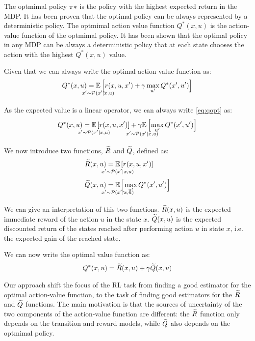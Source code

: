 \documentclass[conference]{IEEEtran}
\begin{document}
The optmimal policy $\pi*$ is the policy with the highest expected return in the MDP. It has been proven that the optimal policy can be always represented by a deterministic policy. The optmimal action velue function $Q^*(x, u)$ is the action-value function of the optmimal policy.
It has been shown that the optimal policy in any MDP can be always a deterministic policy that at each state chooses the action with the highest $Q^*(x, u)$ value.

Given that we can always write the optimal action-value function as:
\begin{align}
 Q^*(x,u)=\underset{\strut\mathclap{x'\sim \Pmodel(x'|x,u)}}{\mathbb{E}}\left[ r(x,u,x')+\gamma\max_{u'} Q^*(x',u')\right]
 \label{eq:qopt}
\end{align}

As the expected value is a linear operator, we can always write \ref{eq:qopt} as:
\begin{align}
 Q^*(x,u)=\underset{\strut\mathclap{x'\sim \Pmodel(x'|x,u)}}{\mathbb{E}}\left[ r(x,u,x')\right]+\underset{\strut\mathclap{x'\sim \Pmodel(x'|x,u)}}{\gamma\mathbb{E}}\left[ \max_{u'} Q^*(x',u')\right]
 \label{eq:qdec}
\end{align}

We now introduce two functions, $\widetilde{R}$ and $\widetilde{Q}$, defined as:
\begin{align}
 \Rtilde(x,u)&=\underset{\strut\mathclap{x'\sim \Pmodel(x'|x,u)}}{\mathbb{E}}\left[ r(x,u,x')\right] \nonumber\ \\
 \Qtilde(x,u)&=\underset{\strut\mathclap{x'\sim \Pmodel(x'|x,u)}}{\mathbb{E}}\left[\max_{u'} Q^*(x',u')\right]
 \label{eq:rqtilde}
\end{align}

We can give an interpretation of this two functions. $\widetilde{R}(x,u)$ is the expected immediate reward of the action $u$ in the state $x$. $\widetilde{Q}(x,u)$ is the expected discounted return of the states reached after performing action $u$ in state $x$, i.e. the expected gain of the reached state.

We can now write the optimal value function as:
\begin{align}
 Q^*(x,u)=\Rtilde(x,u)+\gamma\Qtilde(x,u)
 \label{eq:qdecrqtilde}
\end{align}

Our approach shift the focus of the RL task from finding a good estimator for the optimal action-value function, to the task of finding good estimators for the $\widetilde{R}$ and $\widetilde{Q}$ functions. The main motivation is that the sources of uncertainty of the two components of the action-value function are different: the $\widetilde{R}$ function only depends on the transition and reward models, while $\widetilde{Q}$ also depends on the optmimal policy.
\end{document}
